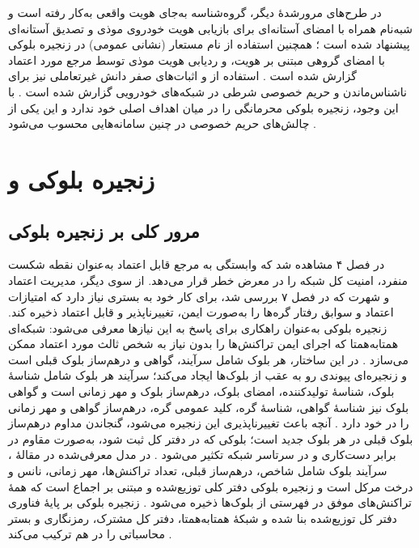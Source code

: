 \documentclass[12pt,a4paper]{article}
\begin{document}
در طرح‌های مرورشدهٔ دیگر، گروه‌شناسه به‌جای هویت واقعی به‌کار رفته است \cite{farsimadanReviewSecurityChallenges2025} و شبه‌نام همراه با امضای آستانه‌ای برای بازیابی هویت خودروی موذی و تصدیق آستانه‌ای پیشنهاد شده است \cite{farsimadanReviewSecurityChallenges2025}؛ همچنین استفاده از نام مستعار (نشانی عمومی) در زنجیره بلوکی با امضای گروهی مبتنی بر هویت، و ردیابی هویت موذی توسط مرجع مورد اعتماد گزارش شده است \cite{razaBlockchainBasedReputationTrust2024}. استفاده از  و اثبات‌های صفر دانش غیرتعاملی نیز برای ناشناس‌ماندن و حریم خصوصی شرطی در شبکه‌های خودرویی گزارش شده است \cite{razaBlockchainBasedReputationTrust2024}. با این وجود، زنجیره بلوکی محرمانگی را در میان اهداف اصلی خود ندارد و این یکی از چالش‌های حریم خصوصی در چنین سامانه‌هایی محسوب می‌شود \cite{razaBlockchainBasedReputationTrust2024}.

\section{زنجیره بلوکی و }

\subsection{مرور کلی بر زنجیره بلوکی}

در فصل ۴ مشاهده شد که وابستگی به مرجع قابل اعتماد به‌عنوان نقطه شکست منفرد، امنیت کل شبکه را در معرض خطر قرار می‌دهد. از سوی دیگر، مدیریت اعتماد و شهرت که در فصل ۷ بررسی شد، برای کار خود به بستری نیاز دارد که امتیازات اعتماد و سوابق رفتار گره‌ها را به‌صورت ایمن، تغییرناپذیر و قابل اعتماد ذخیره کند. زنجیره بلوکی به‌عنوان راهکاری برای پاسخ به این نیاز‌ها معرفی می‌شود: شبکه‌ای همتا‌به‌همتا که اجرای ایمن تراکنش‌ها را بدون نیاز به شخص ثالث مورد اعتماد ممکن می‌سازد \cite{razaBlockchainBasedReputationTrust2024}. در این ساختار، هر بلوک شامل سرآیند، گواهی و درهم‌ساز بلوک قبلی است و زنجیره‌ای پیوندی رو به عقب از بلوک‌ها ایجاد می‌کند؛ سرآیند هر بلوک شامل شناسهٔ بلوک، شناسهٔ تولیدکننده، امضای بلوک، درهم‌ساز بلوک و مهر زمانی است و گواهی بلوک نیز شناسهٔ گواهی، شناسهٔ گره، کلید عمومی گره، درهم‌ساز گواهی و مهر زمانی را در خود دارد \cite{razaBlockchainBasedReputationTrust2024}. آنچه باعث تغییرناپذیری این زنجیره می‌شود، گنجاندن مداوم درهم‌ساز بلوک قبلی در هر بلوک جدید است؛ بلوکی که در دفتر کل ثبت شود، به‌صورت مقاوم در برابر دست‌کاری و در سرتاسر شبکه تکثیر می‌شود \cite{razaBlockchainBasedReputationTrust2024}. در مدل معرفی‌شده در مقالهٔ ، سرآیند بلوک شامل شاخص، درهم‌ساز قبلی، تعداد تراکنش‌ها، مهر زمانی، نانس و درخت مرکل است و زنجیره بلوکی دفتر کلی توزیع‌شده و مبتنی بر اجماع است که همهٔ تراکنش‌های موفق در فهرستی از بلوک‌ها ذخیره می‌شود \cite{ghovanlooyghajarSBTMSScalableBlockchain2021}. زنجیره بلوکی بر پایهٔ فناوری دفتر کل توزیع‌شده بنا شده و شبکهٔ همتا‌به‌همتا، دفتر کل مشترک، رمزنگاری و بستر محاسباتی را در هم ترکیب می‌کند \cite{razaBlockchainBasedReputationTrust2024}.
\end{document}
